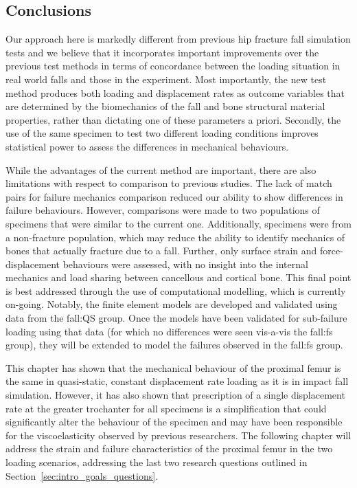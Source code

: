 \subsection{Conclusions}
\label{sec:behave_fail_discssion_conclusions}
Our approach here is markedly different from previous hip fracture fall simulation tests and we believe that it incorporates important improvements over the previous test methods in terms of concordance between the loading situation in real world falls and those in the experiment.
Most importantly, the new test method produces both loading and displacement rates as outcome variables that are determined by the biomechanics of the fall and bone structural material properties, rather than dictating one of these parameters a priori.
Secondly, the use of the same specimen to test two different loading conditions improves statistical power to assess the differences in mechanical behaviours.

While the advantages of the current method are important, there are also limitations with respect to comparison to previous studies.
The lack of match pairs for failure mechanics comparison reduced our ability to show differences in failure behaviours.
However, comparisons were made to two populations of specimens that were similar to the current one.
Additionally, specimens were from a non-fracture population, which may reduce the ability to identify mechanics of bones that actually fracture due to a fall.
Further, only surface strain and force-displacement behaviours were assessed, with no insight into the internal mechanics and load sharing between cancellous and cortical bone.
This final point is best addressed through the use of computational modelling, which is currently on-going.
Notably, the finite element models are developed and validated using data from the fall:\ac{QS} group.
Once the models have been validated for sub-failure loading using that data (for which no differences were seen vis-a-vis the fall:\ac{fs} group), they will be extended to model the failures observed in the fall:\ac{fs} group.

This chapter has shown that the mechanical behaviour of the proximal femur is the same in quasi-static, constant displacement rate loading as it is in impact fall simulation.
However, it has also shown that prescription of a single displacement rate at the greater trochanter for all specimens is a simplification that could significantly alter the behaviour of the specimen and may have been responsible for the viscoelasticity observed by previous researchers.
The following chapter will address the strain and failure characteristics of the proximal femur in the two loading scenarios, addressing the last two research questions outlined in Section~\ref{sec:intro_goals_questions}.